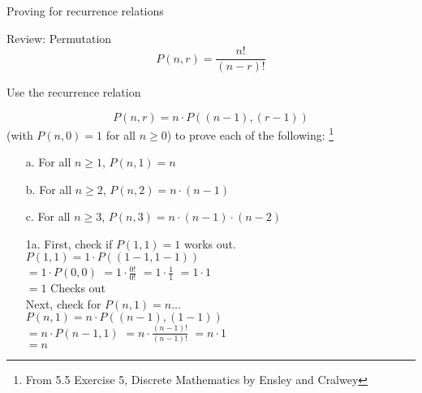 {\begin{intro}{Proving for recurrence relations}
    \end{intro}

    \begin{intro}{Review: Permutation}
        $$P(n,r) = \frac{n!}{(n-r)!}$$
    \end{intro}
    
    \begin{questionNOGRADE}{\thequestion}
        Use the recurrence relation

        $$P(n,r) = n \cdot P((n-1), (r-1))$$
        (with $P(n,0) = 1$ for all $n \geq 0$)
        to prove each of the following:
        \footnote{From 5.5 Exercise 5, Discrete Mathematics by Ensley and Cralwey}

        \begin{itemize}
            \item[a.]   For all $n \geq 1$, $P(n,1) = n$

            \item[b.]   For all $n \geq 2$, $P(n,2) = n \cdot (n-1)$

            \item[c.]   For all $n \geq 3$, $P(n,3) = n \cdot (n-1) \cdot (n-2)$
        \end{itemize}
    \end{questionNOGRADE}

}{

    \begin{enumerate}
        \item[1a.]      First, check if $P(1,1) = 1$ works out. \\
                        $P(1,1) = 1 \cdot P( (1-1, 1-1) )$ \\
                        $ = 1 \cdot P( 0, 0 ) $ \tab
                        $ = 1 \cdot \frac{0!}{0!} $ \tab
                        $ = 1 \cdot \frac{1}{1} $ \tab
                        $ = 1 \cdot 1 $ \\
                        $ = 1 $ \checkmark \tab Checks out \\ 

                        Next, check for $P(n, 1) = n$... \\
                        $P(n, 1) = n \cdot P( (n-1), (1-1) )$ \\
                        $ = n \cdot P( n-1, 1 ) $ \tab
                        $ = n \cdot \frac{ (n-1)! }{ (n-1)! } $ \tab
                        $ = n \cdot 1 $ \\
                        $ = n $ \checkmark
                        

\end{enumerate}}
